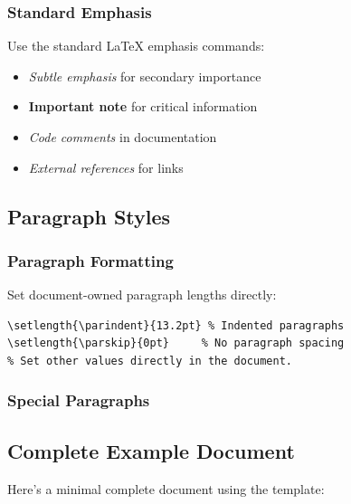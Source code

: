 \subsubsection{Standard Emphasis}

Use the standard LaTeX emphasis commands:

\begin{itemize}
\item \emph{Subtle emphasis} for secondary importance
\item \textbf{Important note} for critical information
\item \textit{Code comments} in documentation
\item \emph{External references} for links
\end{itemize}

\subsection{Paragraph Styles}

\subsubsection{Paragraph Formatting}

Set document-owned paragraph lengths directly:

\begin{verbatim}
\setlength{\parindent}{13.2pt} % Indented paragraphs
\setlength{\parskip}{0pt}     % No paragraph spacing
% Set other values directly in the document.
\end{verbatim}

\subsubsection{Special Paragraphs}


\subsection{Complete Example Document}

Here's a minimal complete document using the template:


